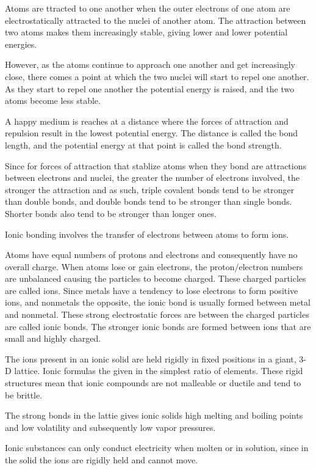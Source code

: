 \documentclass[../chem.tex]{subfiles}
\begin{document}
Atoms are ttracted to one another when the outer electrons of one atom are electrostatically attracted to the nuclei of another atom. The 
attraction between two atoms makes them increasingly stable, giving lower and lower potential energies.

However, as the atoms continue to approach one another and get increasingly close, there comes a point at which the two nuclei will start to repel one another.
As they start to repel one another the potential energy is raised, and the two atoms become less stable.

A happy medium is reaches at a distance where the forces of attraction and repulsion result in the lowest potential energy. The distance is called the 
bond length, and the potential energy at that point is called the bond strength.

Since for forces of attraction that stablize atoms when they bond are attractions between electrons and nuclei, the greater the number of 
electrons involved, the stronger the attraction and as such, triple covalent bonds tend to be stronger than double bonds, and double bonds 
tend to be stronger than single bonds. Shorter bonds also tend to be stronger than longer ones.

Ionic bonding involves the transfer of electrons between atoms to form ions. 

Atoms have equal numbers of protons and electrons and consequently have no overall charge. When atoms lose or gain electrons, the proton/electron numbers 
are unbalanced causing the particles to become charged. These charged particles are called ions. Since metals have a tendency to lose electrons to 
form positive ions, and nonmetals the opposite, the ionic bond is usually formed between metal and nonmetal. These strong electrostatic forces 
are between the charged particles are called ionic bonds. The stronger ionic bonds are formed between ions that are small and highly charged.

The ions present in an ionic solid are held rigidly in fixed positions in a giant, 3-D lattice. Ionic formulas the given in the simplest 
ratio of elements. These rigid structures mean that ionic compounds are not malleable or ductile and tend to be brittle.

The strong bonds in the lattie gives ionic solids high melting and boiling points and low volatility and subsequently low vapor pressures. 

Ionic substances can only conduct electricity when molten or in solution, since in the solid the ions are rigidly held and cannot move.
\end{document}
